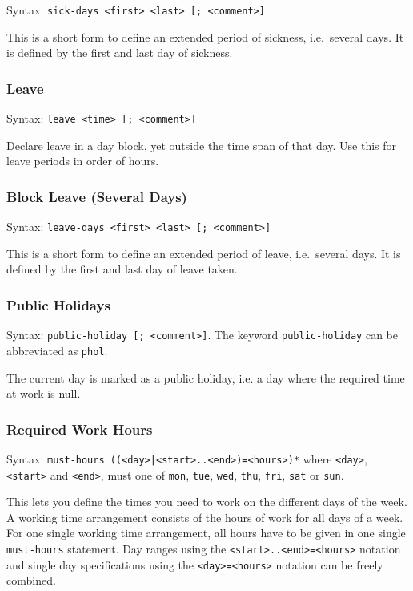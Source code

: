 \documentclass[11pt]{article}
\begin{document}
Syntax: \verb:sick-days <first> <last> [; <comment>]:

This is a short form to define an extended period of sickness, i.e.\ several days. It is defined by the first and last day of sickness.

\subsubsection{Leave}

Syntax: \verb:leave <time> [; <comment>]:

Declare leave in a day block, yet outside the time span of that day. Use this for leave periods in order of hours.

\subsubsection{Block Leave (Several Days)}

Syntax: \verb:leave-days <first> <last> [; <comment>]:

This is a short form to define an extended period of leave, i.e.\ several days. It is defined by the first and last day of leave taken.

\subsubsection{Public Holidays}

Syntax: \verb:public-holiday [; <comment>]:.
The keyword \verb:public-holiday: can be abbreviated as \verb:phol:.

The current day is marked as a public holiday, i.e. a day where the required time at work is null.

\subsubsection{Required Work Hours}

Syntax: \verb:must-hours ((<day>|<start>..<end>)=<hours>)*: where \verb:<day>:, \verb:<start>: and \verb:<end>:, must one of \verb:mon:, \verb:tue:, \verb:wed:, \verb:thu:, \verb:fri:, \verb:sat: or \verb:sun:.

This lets you define the times you need to work on the different days of the week. A working time arrangement consists of the hours of work for all days of a week. For one single working time arrangement, all hours have to be given in one single \verb:must-hours: statement. Day ranges using the \verb:<start>..<end>=<hours>: notation and single day specifications using the \verb:<day>=<hours>: notation can be freely combined.
\end{document}
